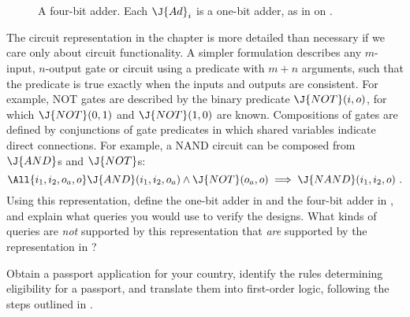 \begin{figure}[tbp]
\caption{A four-bit adder. Each \(\J{Ad}_i\) is a one-bit adder, as in 
on .}\label{4bit-adder-figure}
\end{figure} 

\begin{iexercise}
The circuit representation in the chapter is more detailed than necessary
if we care only about circuit functionality. A simpler formulation
describes any \(m\)-input, \(n\)-output gate or circuit using a predicate
with \(m+n\) arguments, such that the predicate is true exactly when the
inputs and outputs are consistent. For example, NOT gates are described
by the binary predicate \(\J{NOT}(i,o)\), for which \(\J{NOT}(0,1)\) and \(\J{NOT}(1,0)\)
are known. Compositions of gates are defined by conjunctions
of gate predicates in which shared variables indicate direct connections.
For example, a NAND circuit can be composed from \(\J{AND}\)s and \(\J{NOT}\)s:
\[
  \All{i_1,i_2,o_a,o} \J{AND}(i_1,i_2,o_a) \land \J{NOT}(o_a,o) \implies \J{NAND}(i_1,i_2,o)\ .
\]
Using this representation, define the one-bit adder in 
and the four-bit adder in , and explain
what queries you would use to verify the designs.
What kinds of queries are {\em not} supported by this representation
that {\em are} supported by the representation in ?
\end{iexercise} 

\begin{exercise}
Obtain a passport application for your country, identify the rules
determining eligibility for a passport, and translate them into
first-order logic, following the steps outlined in
.
\end{exercise} 

